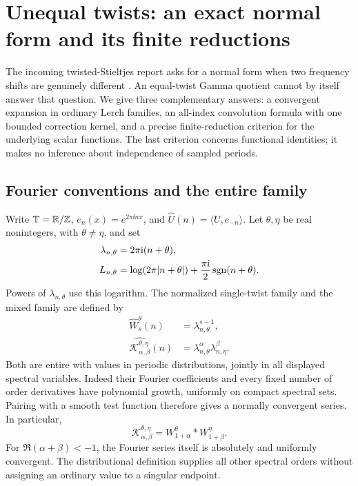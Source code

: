 \section{Unequal twists: an exact normal form and its finite reductions}
\label{tw:sec}

The incoming twisted-Stieltjes report asks for a normal form when two
frequency shifts are genuinely different
\cite[research question on unequal twists]{RepoTwisted}.
An equal-twist Gamma quotient cannot by itself answer that question.
We give three complementary answers: a convergent expansion in ordinary
Lerch families, an all-index convolution formula with one bounded
correction kernel, and a precise finite-reduction criterion for the
underlying scalar functions. The last criterion concerns functional
identities; it makes no inference about independence of sampled periods.

\subsection{Fourier conventions and the entire family}

Write $\mathbb T=\mathbb R/\mathbb Z$, $e_n(x)=e^{2\pi\ii nx}$, and
$\widehat U(n)=\langle U,e_{-n}\rangle$. Let $\theta,\eta$ be real
nonintegers, with $\theta\ne\eta$, and set
\begin{align}
 \lambda_{n,\theta}&=2\pi\mathrm i(n+\theta),\\
 L_{n,\theta}&=\log(2\pi|n+\theta|)
                +\frac{\pi\mathrm i}{2}\operatorname{sgn}(n+\theta).
 \label{tw:log}
\end{align}
Powers of $\lambda_{n,\theta}$ use this logarithm. The normalized
single-twist family and the mixed family are defined by
\begin{align}
 \widehat W_s^\theta(n)&=\lambda_{n,\theta}^{s-1},\label{tw:W}\\
 \widehat{\mathcal K_{\alpha,\beta}^{\theta,\eta}}(n)
   &=\lambda_{n,\theta}^{\alpha}\lambda_{n,\eta}^{\beta}.
 \label{tw:K}
\end{align}
Both are entire with values in periodic distributions, jointly in all
displayed spectral variables. Indeed their Fourier coefficients and every
fixed number of order derivatives have polynomial growth, uniformly on
compact spectral sets. Pairing with a smooth test function therefore gives
a normally convergent series. In particular,
\begin{equation}
 \mathcal K_{\alpha,\beta}^{\theta,\eta}
   =W_{1+\alpha}^{\theta}*W_{1+\beta}^{\eta}.
 \label{tw:Kconv}
\end{equation}
For $\Re(\alpha+\beta)<-1$, the Fourier series itself is absolutely
and uniformly convergent. The distributional definition supplies all
other spectral orders without assigning an ordinary value to a singular
endpoint.

